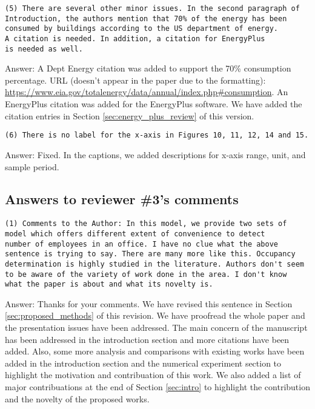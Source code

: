 \begin{verbatim}
(5) There are several other minor issues. In the second paragraph of
Introduction, the authors mention that 70% of the energy has been
consumed by buildings according to the US department of energy.
A citation is needed. In addition, a citation for EnergyPlus
is needed as well.
\end{verbatim}

Answer: A Dept Energy citation was added to support the 70\% consumption
percentage.  URL (doesn't appear in the paper due to the formatting):
\url{https://www.eia.gov/totalenergy/data/annual/index.php\#consumption}. An
EnergyPlus citation was added for the EnergyPlus software. We have added the
citation entries in Section \ref{sec:energy_plus_review} of this version.

\begin{verbatim}
(6) There is no label for the x-axis in Figures 10, 11, 12, 14 and 15.
\end{verbatim}

Answer: Fixed. In the captions, we added descriptions for x-axis range, unit, and
sample period.

\subsection{Answers to reviewer \#3's comments}
\begin{verbatim}
(1) Comments to the Author: In this model, we provide two sets of
model which offers different extent of convenience to detect
number of employees in an office. I have no clue what the above
sentence is trying to say. There are many more like this. Occupancy
determination is highly studied in the literature. Authors don't seem
to be aware of the variety of work done in the area. I don't know
what the paper is about and what its novelty is.
\end{verbatim}

Answer: Thanks for your comments. We have revised this sentence in
Section \ref{sec:proposed_methods} of this revision. We have proofread
the whole paper and the presentation issues have been addressed. The
main concern of the manuscript has been addressed in the introduction
section and more citations have been added. Also, some more analysis
and comparisons with existing works have been added in the
introduction section and the numerical experiment section to highlight
the motivation and contribuation of this work. We also added a list of
major contribuations at the end of Section \ref{sec:intro} to
highlight the contribution and the novelty of the proposed works.

